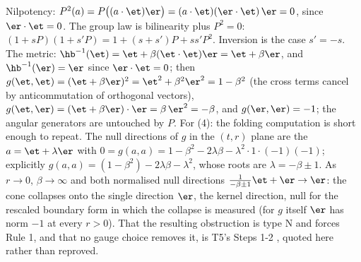 Nilpotency: $P^2(a) = P\bigl((a\cdot\et)\er\bigr) = (a\cdot\et)(\er\cdot\et)\,\er = 0$, since $\er \cdot \et = 0$. The group law is bilinearity plus $P^2 = 0$: $(1 + sP)(1 + s'P) = 1 + (s + s')P + ss'P^2$. Inversion is the case $s' = -s$. The metric: $\hb^{-1}(\et) = \et + \beta(\et\cdot\et)\er = \et + \beta\er$, and $\hb^{-1}(\er) = \er$ since $\er \cdot \et = 0$; then $g(\et,\et) = (\et + \beta\er)^2 = \et^2 + \beta^2\er^2 = 1 - \beta^2$ (the cross terms cancel by anticommutation of orthogonal vectors), $g(\et,\er) = (\et + \beta\er)\cdot\er = \beta\,\er^2 = -\beta$, and $g(\er,\er) = -1$; the angular generators are untouched by $P$. For (4): the folding computation is short enough to repeat. The null directions of $g$ in the $(t,r)$ plane are the $a = \et + \lambda\er$ with $0 = g(a,a) = 1 - \beta^2 - 2\lambda\beta - \lambda^2 \cdot 1 \cdot (-1)(-1)$; explicitly $g(a,a) = (1-\beta^2) - 2\lambda\beta - \lambda^2$, whose roots are $\lambda = -\beta \pm 1$. As $r \to 0$, $\beta \to \infty$ and both normalised null directions $\tfrac{1}{-\beta\pm1}\et + \er \to \er$: the cone collapses onto the single direction $\er$, the kernel direction, null for the rescaled boundary form in which the collapse is measured \cite[Prop.~2.6]{ButlerT5} (for $g$ itself $\er$ has norm $-1$ at every $r > 0$). That the resulting obstruction is type N and forces Rule 1, and that no gauge choice removes it, is T5's Steps 1-2 \cite{ButlerT5}, quoted here rather than reproved.
